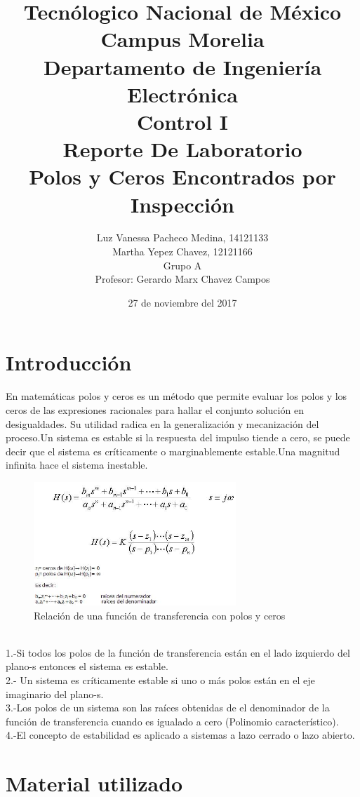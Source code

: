 \documentclass[12pt,letterpaper]{article}     %
\author{Luz Vanessa Pacheco Medina, 14121133 \\ Martha Yepez Chavez, 12121166 \\ {\small Grupo A}\\ Profesor: Gerardo Marx Chavez Campos  \vspace*{3.0in}}
\title{Tecnólogico Nacional de México\\Campus Morelia\\{\small Departamento de Ingeniería Electrónica\\Control I\\\vspace*{0.55in} Reporte De Laboratorio}\\ Polos y Ceros Encontrados por Inspección \vspace*{1.35in}}
\date{27 de noviembre del 2017}
\begin{document}


\maketitle							%


\tableofcontents
\newpage
\listoffigures

\newpage
\section{Introducción}
En matemáticas polos y ceros es un método que permite evaluar los polos y los ceros  de las expresiones racionales  para hallar el conjunto solución en desigualdades. Su utilidad radica en la generalización y mecanización del proceso.Un sistema es estable si la respuesta del impulso tiende a cero, se puede decir que el sistema es críticamente o marginablemente estable.Una magnitud infinita hace el sistema inestable.
\begin{figure}[h!]
\centering
\includegraphics[width=3in]{Polos}
\caption{Relación de una función de transferencia con polos y ceros}
\end{figure}
\\
1.-Si todos los polos de la función de transferencia están  en el lado izquierdo del plano-s entonces el sistema es estable.
\\
2.- Un sistema es críticamente estable si uno o más polos están en el eje imaginario del plano-s.
\\
3.-Los polos de un sistema son las raíces obtenidas de el denominador de la función de transferencia cuando es igualado a cero (Polinomio característico).
\\
4.-El concepto de estabilidad es aplicado a sistemas a lazo cerrado o lazo abierto.

\section{Material utilizado} 
\end{document}
